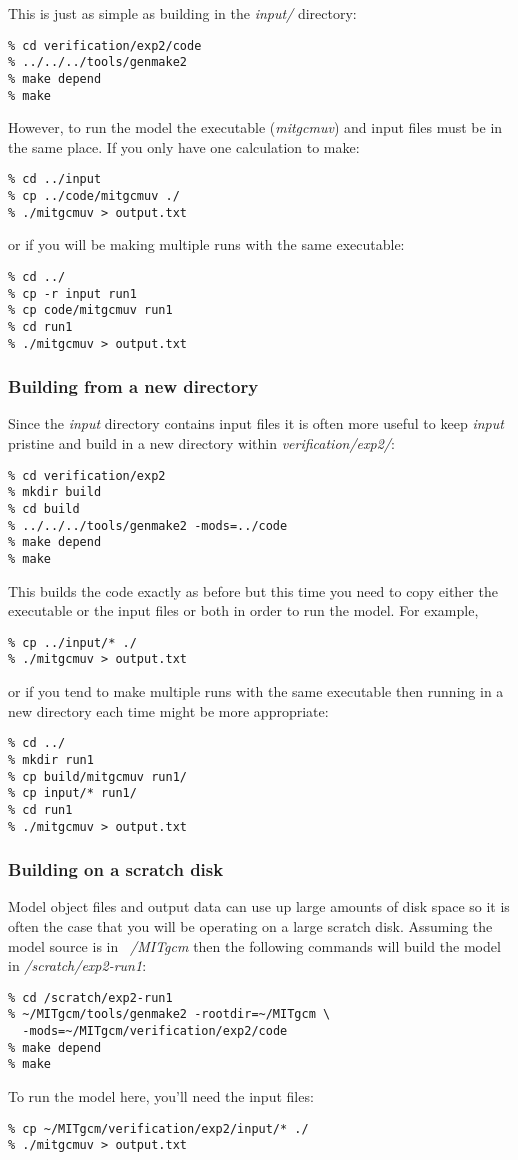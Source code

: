 This is just as simple as building in the {\em input/} directory:
\begin{verbatim}
% cd verification/exp2/code
% ../../../tools/genmake2
% make depend
% make
\end{verbatim}
However, to run the model the executable ({\em mitgcmuv}) and input
files must be in the same place. If you only have one calculation to make:
\begin{verbatim}
% cd ../input
% cp ../code/mitgcmuv ./
% ./mitgcmuv > output.txt
\end{verbatim}
or if you will be making multiple runs with the same executable:
\begin{verbatim}
% cd ../
% cp -r input run1
% cp code/mitgcmuv run1
% cd run1
% ./mitgcmuv > output.txt
\end{verbatim}

\subsubsection{Building from a new directory}

Since the {\em input} directory contains input files it is often more
useful to keep {\em input} pristine and build in a new directory
within {\em verification/exp2/}:
\begin{verbatim}
% cd verification/exp2
% mkdir build
% cd build
% ../../../tools/genmake2 -mods=../code
% make depend
% make
\end{verbatim}
This builds the code exactly as before but this time you need to copy
either the executable or the input files or both in order to run the
model. For example,
\begin{verbatim}
% cp ../input/* ./
% ./mitgcmuv > output.txt
\end{verbatim}
or if you tend to make multiple runs with the same executable then
running in a new directory each time might be more appropriate:
\begin{verbatim}
% cd ../
% mkdir run1
% cp build/mitgcmuv run1/
% cp input/* run1/
% cd run1
% ./mitgcmuv > output.txt
\end{verbatim}

\subsubsection{Building on a scratch disk}

Model object files and output data can use up large amounts of disk
space so it is often the case that you will be operating on a large
scratch disk. Assuming the model source is in {\em ~/MITgcm} then the
following commands will build the model in {\em /scratch/exp2-run1}:
\begin{verbatim}
% cd /scratch/exp2-run1
% ~/MITgcm/tools/genmake2 -rootdir=~/MITgcm \
  -mods=~/MITgcm/verification/exp2/code
% make depend
% make
\end{verbatim}
To run the model here, you'll need the input files:
\begin{verbatim}
% cp ~/MITgcm/verification/exp2/input/* ./
% ./mitgcmuv > output.txt
\end{verbatim}

